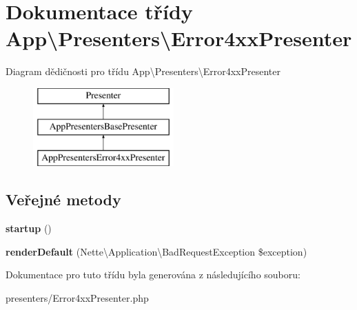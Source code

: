\hypertarget{classApp_1_1Presenters_1_1Error4xxPresenter}{\section{Dokumentace třídy App\textbackslash{}Presenters\textbackslash{}Error4xx\-Presenter}
\label{classApp_1_1Presenters_1_1Error4xxPresenter}
}
Diagram dědičnosti pro třídu App\textbackslash{}Presenters\textbackslash{}Error4xx\-Presenter\begin{figure}[H]
\begin{center}
\leavevmode
\includegraphics[height=3.000000cm]{classApp_1_1Presenters_1_1Error4xxPresenter}
\end{center}
\end{figure}
\subsection*{Veřejné metody}
\begin{DoxyCompactItemize}
\item 
\hypertarget{classApp_1_1Presenters_1_1Error4xxPresenter_a74554da47cce26e25d783141c95da87b}{{\bfseries startup} ()}\label{classApp_1_1Presenters_1_1Error4xxPresenter_a74554da47cce26e25d783141c95da87b}

\item 
\hypertarget{classApp_1_1Presenters_1_1Error4xxPresenter_a7b1526f98943508230687ae594873c1d}{{\bfseries render\-Default} (Nette\textbackslash{}\-Application\textbackslash{}\-Bad\-Request\-Exception \$exception)}\label{classApp_1_1Presenters_1_1Error4xxPresenter_a7b1526f98943508230687ae594873c1d}

\end{DoxyCompactItemize}


Dokumentace pro tuto třídu byla generována z následujícího souboru\-:\begin{DoxyCompactItemize}
\item 
presenters/Error4xx\-Presenter.\-php\end{DoxyCompactItemize}
